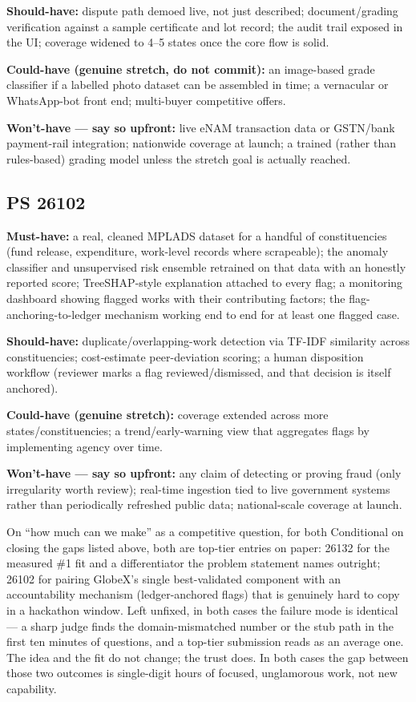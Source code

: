 \documentclass[11pt]{article}
\begin{document}
\textbf{Should-have:} dispute path demoed live, not just described; document/grading verification against a
sample certificate and lot record; the audit trail exposed in the UI; coverage widened to 4--5 states once
the core flow is solid.

\textbf{Could-have (genuine stretch, do not commit):} an image-based grade classifier if a labelled photo
dataset can be assembled in time; a vernacular or WhatsApp-bot front end; multi-buyer competitive offers.

\textbf{Won't-have --- say so upfront:} live eNAM transaction data or GSTN/bank payment-rail integration;
nationwide coverage at launch; a trained (rather than rules-based) grading model unless the stretch goal is
actually reached.

\subsection*{PS 26102}
\textbf{Must-have:} a real, cleaned MPLADS dataset for a handful of constituencies (fund release,
expenditure, work-level records where scrapeable); the anomaly classifier and unsupervised risk ensemble
retrained on that data with an honestly reported score; TreeSHAP-style explanation attached to every flag; a
monitoring dashboard showing flagged works with their contributing factors; the flag-anchoring-to-ledger
mechanism working end to end for at least one flagged case.

\textbf{Should-have:} duplicate/overlapping-work detection via TF-IDF similarity across constituencies;
cost-estimate peer-deviation scoring; a human disposition workflow (reviewer marks a flag reviewed/dismissed,
and that decision is itself anchored).

\textbf{Could-have (genuine stretch):} coverage extended across more states/constituencies; a
trend/early-warning view that aggregates flags by implementing agency over time.

\textbf{Won't-have --- say so upfront:} any claim of detecting or proving fraud (only irregularity worth
review); real-time ingestion tied to live government systems rather than periodically refreshed public data;
national-scale coverage at launch.

\begin{warnbox}{On ``how much can we make'' as a competitive question, for both}
Conditional on closing the gaps listed above, both are top-tier entries on paper: 26132 for the measured
\#1 fit and a differentiator the problem statement names outright; 26102 for pairing GlobeX's single
best-validated component with an accountability mechanism (ledger-anchored flags) that is genuinely hard to
copy in a hackathon window. Left unfixed, in both cases the failure mode is identical --- a sharp judge finds
the domain-mismatched number or the stub path in the first ten minutes of questions, and a top-tier
submission reads as an average one. The idea and the fit do not change; the trust does. In both cases the
gap between those two outcomes is single-digit hours of focused, unglamorous work, not new capability.
\end{warnbox}
\end{document}
